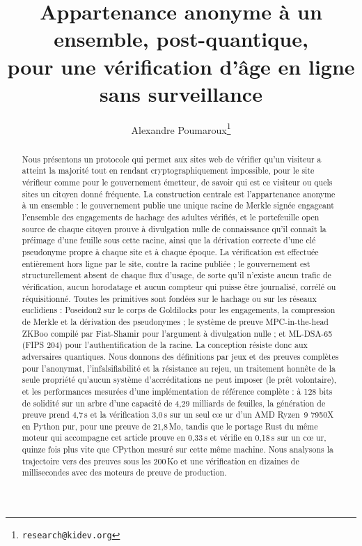 \documentclass[11pt]{article}
\title{Appartenance anonyme à un ensemble, post-quantique,\\
pour une vérification d'âge en ligne sans surveillance}
\author{Alexandre Poumaroux\thanks{\texttt{research@kidev.org}}}
\date{}
\theoremstyle{definition}
\begin{document}
\maketitle

\begin{abstract}
Nous présentons un protocole qui permet aux sites web de vérifier qu'un visiteur a atteint
la majorité tout en rendant cryptographiquement impossible, pour le site vérifieur comme
pour le gouvernement émetteur, de savoir qui est ce visiteur ou quels sites un citoyen
donné fréquente. La construction centrale est l'appartenance anonyme à un ensemble : le
gouvernement publie une unique racine de Merkle signée engageant l'ensemble des
engagements de hachage des adultes vérifiés, et le portefeuille open source de chaque
citoyen prouve à divulgation nulle de connaissance qu'il connaît la préimage d'une feuille
sous cette racine, ainsi que la dérivation correcte d'une clé pseudonyme propre à chaque
site et à chaque époque. La vérification est effectuée entièrement hors ligne par le site,
contre la racine publiée ; le gouvernement est structurellement absent de chaque flux
d'usage, de sorte qu'il n'existe aucun trafic de vérification, aucun horodatage et aucun
compteur qui puisse être journalisé, corrélé ou réquisitionné. Toutes les primitives sont
fondées sur le hachage ou sur les réseaux euclidiens : Poseidon2 sur le corps de
Goldilocks pour les engagements, la compression de Merkle et la dérivation des pseudonymes
; le système de preuve MPC-in-the-head ZKBoo compilé par Fiat-Shamir pour l'argument à
divulgation nulle ; et ML-DSA-65 (FIPS 204) pour l'authentification de la racine. La
conception résiste donc aux adversaires quantiques. Nous donnons des définitions par jeux
et des preuves complètes pour l'anonymat, l'infalsifiabilité et la résistance au rejeu, un
traitement honnête de la seule propriété qu'aucun système d'accréditations ne peut imposer
(le prêt volontaire), et les performances mesurées d'une implémentation de référence
complète : à 128 bits de solidité sur un arbre d'une capacité de 4,29 milliards de
feuilles, la génération de preuve prend 4,7\,s et la vérification 3,0\,s sur un seul c\oe
ur d'un AMD Ryzen~9 7950X en Python pur, pour une preuve de 21,8\,Mo, tandis que le portage Rust du
même moteur qui accompagne cet article prouve en 0,33\,s et vérifie en 0,18\,s sur un c\oe
ur, quinze fois plus vite que CPython mesuré sur cette même machine. Nous analysons la
trajectoire vers des preuves sous les 200\,Ko et une vérification en dizaines de
millisecondes avec des moteurs de preuve de production.
\end{abstract}
\end{document}
